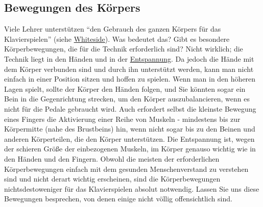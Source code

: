 
\subsection{Bewegungen des Körpers}\hypertarget{c1iii4c}{}

Viele Lehrer unterstützen \enquote{den Gebrauch des ganzen Körpers für das Klavierspielen} (siehe \hyperlink{Whiteside}{Whiteside}).
Was bedeutet das?
Gibt es besondere Körperbewegungen, die für die Technik erforderlich sind?
Nicht wirklich; die Technik liegt in den Händen und in der \hyperlink{c1ii14}{Entspannung}.
Da jedoch die Hände mit dem Körper verbunden sind und durch ihn unterstützt werden, kann man nicht einfach in einer Position sitzen und hoffen zu spielen.
Wenn man in den höheren Lagen spielt, sollte der Körper den Händen folgen, und Sie könnten sogar ein Bein in die Gegenrichtung strecken, um den Körper auszubalancieren, wenn es nicht für die Pedale gebraucht wird.
Auch erfordert selbst die kleinste Bewegung eines Fingers die Aktivierung einer Reihe von Muskeln - mindestens bis zur Körpermitte (nahe des Brustbeins) hin, wenn nicht sogar bis zu den Beinen und anderen Körperteilen, die den Körper unterstützen.
Die Entspannung ist, wegen der schieren Größe der einbezogenen Muskeln, im Körper genauso wichtig wie in den Händen und den Fingern.
Obwohl die meisten der erforderlichen Körperbewegungen einfach mit dem gesunden Menschenverstand zu verstehen sind und nicht derart wichtig erscheinen, sind die Körperbewegungen nichtsdestoweniger für das Klavierspielen absolut notwendig.
Lassen Sie uns diese Bewegungen besprechen, von denen einige nicht völlig offensichtlich sind.

